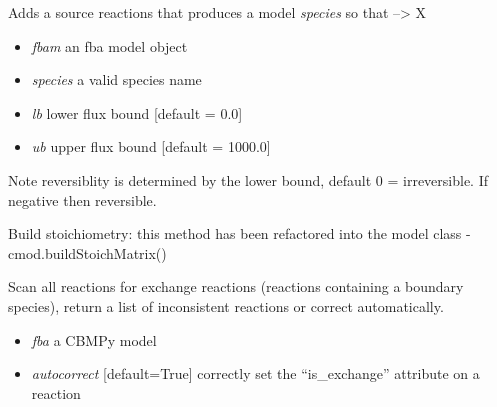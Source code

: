 \documentclass[a4paper,11pt,english]{sphinxmanual}
\begin{document}
\begin{fulllineitems}
\label{modules_doc:cbmpy.CBTools.addSourceReaction}
Adds a source reactions that produces a model \emph{species} so that --\textgreater{} X
\begin{itemize}
\item {} 
\emph{fbam} an fba model object

\item {} 
\emph{species} a valid species name

\item {} 
\emph{lb} lower flux bound {[}default = 0.0{]}

\item {} 
\emph{ub} upper flux bound {[}default = 1000.0{]}

\end{itemize}

Note reversiblity is determined by the lower bound, default 0 = irreversible. If
negative then reversible.

\end{fulllineitems}


\begin{fulllineitems}
\label{modules_doc:cbmpy.CBTools.addStoichToFBAModel}
Build stoichiometry: this method has been refactored into the model class - cmod.buildStoichMatrix()

\end{fulllineitems}


\begin{fulllineitems}
\label{modules_doc:cbmpy.CBTools.checkExchangeReactions}
Scan all reactions for exchange reactions (reactions containing a boundary species), return a list of
inconsistent reactions or correct automatically.
\begin{itemize}
\item {} 
\emph{fba} a CBMPy model

\item {} 
\emph{autocorrect} {[}default=True{]} correctly set the ``is\_exchange'' attribute on a reaction

\end{itemize}

\end{fulllineitems}
\end{document}
